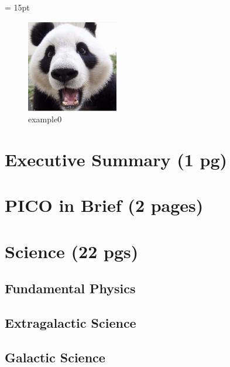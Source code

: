 \documentclass[12pt]{article}
\begin{document}


\setlength{\baselineskip}{0.96\baselineskip} %
\setlength{\parskip}{1.\parskip}

\parindent = 15pt

\tableofcontents

\setcounter{page}{0}
\setcounter{figure}{0}

\newpage

\begin{figure}[!htb]
\centering
\includegraphics[width=4cm]{images/example0}
\caption{example0}
\label{fig:im_1}
\end{figure}
%

\section{Executive Summary (1 pg)} 


\section{PICO in Brief (2 pages)}


\section{Science (22 pgs)}

\subsection{Fundamental Physics}


\subsection{Extragalactic Science}


\subsection{Galactic Science}

\end{document}
